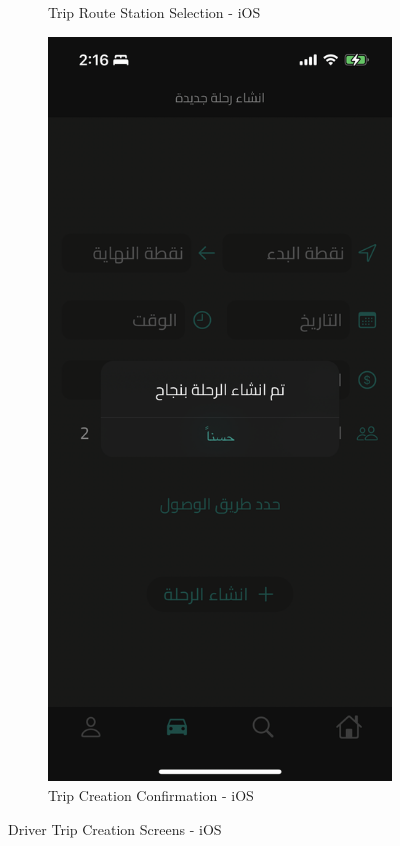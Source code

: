 \documentclass[a4paper, 12pt]{report} %
\begin{document}
\begin{figure}[H]
\begin{subfigure}{0.3\textwidth}
                    \caption{Trip Route Station Selection - iOS}
                    \label{fig:trip_cration_3}
                \end{subfigure}
                \begin{subfigure}{0.3\textwidth}
                    \includegraphics[width=\linewidth]{Images/trip_creation_4.png}  
                    \caption{Trip Creation Confirmation - iOS}
                    \label{fig:trip_cration_4}
                \end{subfigure}
                \caption{Driver Trip Creation Screens - iOS}
                \label{fig:trip_creation}
            \end{figure}
        
\end{document}
